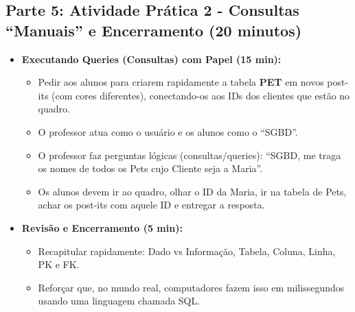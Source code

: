 \documentclass[12pt,a4paper]{article}
\begin{document}
\subsection*{Parte 5: Atividade Prática 2 - Consultas ``Manuais'' e Encerramento (20 minutos)}
\begin{itemize}[leftmargin=*,itemsep=0.35em]
  \item \textbf{Executando Queries (Consultas) com Papel (15 min):}
  \begin{itemize}[leftmargin=*,itemsep=0.25em]
    \item Pedir aos alunos para criarem rapidamente a tabela \textbf{PET} em novos post-its (com cores diferentes), conectando-os aos IDs dos clientes que estão no quadro.
    \item O professor atua como o usuário e os alunos como o ``SGBD''.
    \item O professor faz perguntas lógicas (consultas/queries): ``SGBD, me traga os nomes de todos os Pets cujo Cliente seja a Maria''.
    \item Os alunos devem ir ao quadro, olhar o ID da Maria, ir na tabela de Pets, achar os post-its com aquele ID e entregar a resposta.
  \end{itemize}

  \item \textbf{Revisão e Encerramento (5 min):}
  \begin{itemize}[leftmargin=*,itemsep=0.25em]
    \item Recapitular rapidamente: Dado vs Informação, Tabela, Coluna, Linha, PK e FK.
    \item Reforçar que, no mundo real, computadores fazem isso em milissegundos usando uma linguagem chamada SQL.
  \end{itemize}
\end{itemize}
\end{document}
